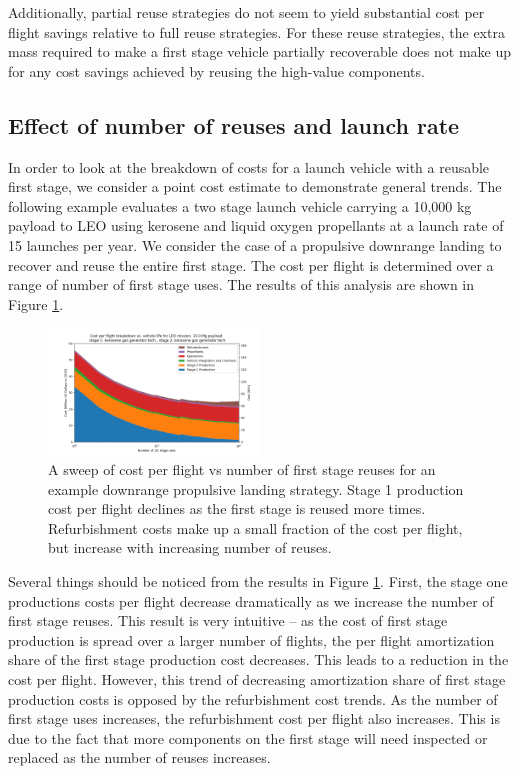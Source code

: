 \documentclass[conf]{new-aiaa}
\begin{document}
\begin{multicols}{2}
Additionally, partial reuse strategies do not seem to yield substantial cost per flight savings relative to full reuse strategies. For these reuse strategies, the extra mass required to make a first stage vehicle partially recoverable does not make up for any cost savings achieved by reusing the high-value components. 


\subsection{Effect of number of reuses and launch rate}
In order to look at the breakdown of costs for a launch vehicle with a reusable first stage, we consider a point cost estimate to demonstrate general trends. The following example evaluates a two stage launch vehicle carrying a 10,000 kg payload to LEO using kerosene and liquid oxygen propellants at a launch rate of 15 launches per year. We consider the case of a propulsive downrange landing to recover and reuse the entire first stage. The cost per flight is determined over a range of number of first stage uses. The results of this analysis are shown in Figure \ref{fig:cpf_stackplot_reuses_sweep}.

\begin{figure}[H]
    \centering
    \includegraphics[width=0.5\textwidth]{../../lvreuse/analysis/combined/plots/cpf_stackplot_reuses_sweep}
    \caption{\label{fig:cpf_stackplot_reuses_sweep} A sweep of cost per flight vs number of first stage reuses for an example downrange propulsive landing strategy. Stage 1 production cost per flight declines as the first stage is reused more times. Refurbishment costs make up a small fraction of the cost per flight, but increase with increasing number of reuses.}
\end{figure}

Several things should be noticed from the results in Figure \ref{fig:cpf_stackplot_reuses_sweep}. First, the stage one productions costs per flight decrease dramatically as we increase the number of first stage reuses. This result is very intuitive -- as the cost of first stage production is spread over a larger number of flights, the per flight amortization share of the first stage production cost decreases. This leads to a reduction in the cost per flight. However, this trend of decreasing amortization share of first stage production costs is opposed by the refurbishment cost trends. As the number of first stage uses increases, the refurbishment cost per flight also increases. This is due to the fact that more components on the first stage will need inspected or replaced  as the number of reuses increases. 


\end{multicols}
\end{document}
